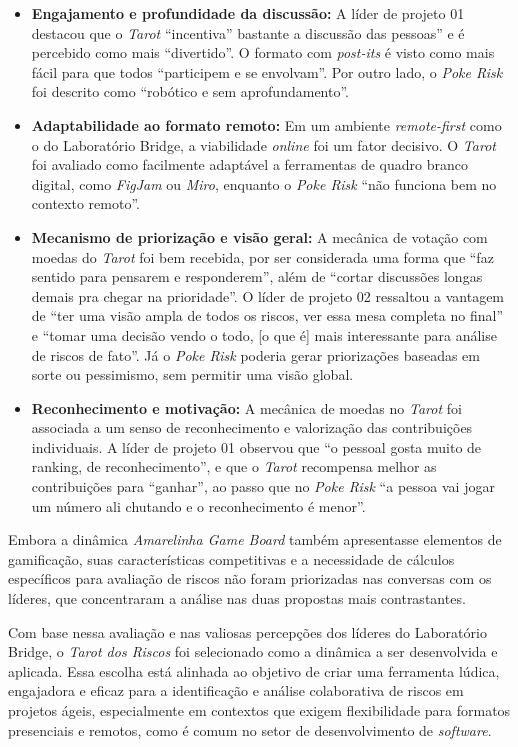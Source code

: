 \documentclass[
	12pt,
	openright,
	twoside,
	a4paper,
	english,
	brazil
	]{abntex2}
\begin{document}
\begin{itemize}
    \item \textbf{Engajamento e profundidade da discussão:} A líder de projeto 01 destacou que o \textit{Tarot} “incentiva” bastante a discussão das pessoas” e é percebido como mais “divertido”. O formato com \textit{post-its} é visto como mais fácil para que todos “participem e se envolvam”. Por outro lado, o \textit{Poke Risk} foi descrito como “robótico e sem aprofundamento”. 
    \item \textbf{Adaptabilidade ao formato remoto:} Em um ambiente \textit{remote-first} como o do Laboratório Bridge, a viabilidade \textit{online} foi um fator decisivo. O \textit{Tarot} foi avaliado como facilmente adaptável a ferramentas de quadro branco digital, como \textit{FigJam} ou \textit{Miro}, enquanto o \textit{Poke Risk} “não funciona bem no contexto remoto”. 
    \item \textbf{Mecanismo de priorização e visão geral:} A mecânica de votação com moedas do \textit{Tarot} foi bem recebida, por ser considerada uma forma que “faz sentido para pensarem e responderem”, além de “cortar discussões longas demais pra chegar na prioridade”. O líder de projeto 02 ressaltou a vantagem de “ter uma visão ampla de todos os riscos, ver essa mesa completa no final” e “tomar uma decisão vendo o todo, [o que é] mais interessante para análise de riscos de fato”. Já o \textit{Poke Risk} poderia gerar priorizações baseadas em sorte ou pessimismo, sem permitir uma visão global.
    \item \textbf{Reconhecimento e motivação:} A mecânica de moedas no \textit{Tarot} foi associada a um senso de reconhecimento e valorização das contribuições individuais. A líder de projeto 01 observou que “o pessoal gosta muito de ranking, de reconhecimento”, e que o \textit{Tarot} recompensa melhor as contribuições para “ganhar”, ao passo que no \textit{Poke Risk} “a pessoa vai jogar um número ali chutando e o reconhecimento é menor”. 
\end{itemize}

Embora a dinâmica \textit{Amarelinha Game Board} também apresentasse elementos de gamificação, suas características competitivas e a necessidade de cálculos específicos para avaliação de riscos não foram priorizadas nas conversas com os líderes, que concentraram a análise nas duas propostas mais contrastantes.

Com base nessa avaliação e nas valiosas percepções dos líderes do Laboratório Bridge, o \textit{Tarot dos Riscos} foi selecionado como a dinâmica a ser desenvolvida e aplicada. Essa escolha está alinhada ao objetivo de criar uma ferramenta lúdica, engajadora e eficaz para a identificação e análise colaborativa de riscos em projetos ágeis, especialmente em contextos que exigem flexibilidade para formatos presenciais e remotos, como é comum no setor de desenvolvimento de \textit{software}.
\end{document}
